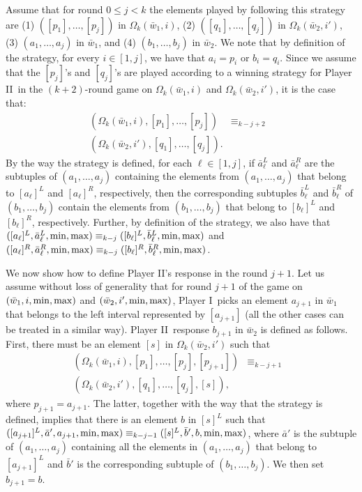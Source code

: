 \documentclass{LMCS}
\newcommand{\dupl}{Player II}
\newcommand{\spoiler}{Player I}
\newcommand{\w}{{\bar{w}}}
\renewcommand{\l}{\ell}
\theoremstyle{plain}
\theoremstyle{definition}
\begin{document}
Assume that for round $0 \leq j < k$ the elements played by following
this strategy are (1) $([p_1],\dots,[p_j])$ in $\Omega_k(\w_1,i)$, (2)
$([q_1],\dots,[q_j])$ in $\Omega_k(\w_2,i')$, (3) $(a_1,\dots,a_j)$ in
$\w_1$, and (4) $(b_1,\dots,b_j)$ in $\w_2$. We note that by
definition of the strategy, for every $i \in [1,j]$, we have that $a_i
= p_i$ or $b_i = q_i$. Since we assume that the $[p_j]$'s and
$[q_j]$'s are played according to a winning strategy for \dupl\ in the
$(k+2)$-round game on $\Omega_k(\w_1,i)$ and $\Omega_k(\w_2,i')$, it
is the case that: \begin{eqnarray*}
(\Omega_k(\w_1,i),[p_1],\dots,[p_j]) & \equiv_{k-j+2} &\\
(\Omega_k(\w_2,i'),[q_1],\dots,[q_j]).  \end{eqnarray*} By the way the
strategy is defined, for each $\l \in [1,j]$, if $\bar a_\l^L$ and
$\bar a_\l^R$ are the subtuples of $(a_1, \ldots, a_j)$ containing the
elements from $(a_1, \ldots, a_j)$ that belong to $[a_\l]^L$ and
$[a_\l]^R$, respectively, then the corresponding subtuples $\bar
b_\l^L$ and $\bar b_\l^R$ of $(b_1,\dots,b_j)$ contain the elements
from $(b_1, \ldots, b_j)$ that belong to $[b_\l]^L$ and $[b_\l]^R$,
respectively. Further, by definition of the strategy, we also have
that $([a_\l]^L,\bar a^L_\l,\min,\maxx) \equiv_{k - j} ([b_\l]^L,\bar
b^L_\l,\min,\maxx)$ and $([a_\l]^R,\bar a^R_\l,\min,\maxx) \equiv_{k -
j} ([b_\l]^R,\bar b^R_\l,\min,\maxx)$.



We now show how to define \dupl's response in the round $j+1$.  Let us
assume without loss of generality that for round $j+1$ of the game on
$(\w_1,i,\min,\maxx)$ and $(\w_2,i',\min,\maxx)$, \spoiler\ picks an
element $a_{j+1}$ in $\w_1$ that belongs to the left interval
represented by $[a_{j+1}]$ (all the other cases can be treated in a
similar way). \dupl\ response $b_{j+1}$ in $\w_2$ is defined as
follows. First, there must be an element $[s]$ in $\Omega_k(\w_2,i')$
such that \begin{eqnarray*}
(\Omega_k(\w_1,i),[p_1],\dots,[p_j],[p_{j+1}]) & \equiv_{k-j+1} & \\
(\Omega_k(\w_2,i'),[q_1],\dots,[q_j],[s]), \end{eqnarray*} where
$p_{j+1} = a_{j+1}$. The latter, together with the way that the
strategy is defined, implies that there is an element $b$ in $[s]^L$
such that $([a_{j+1}]^L,\bar a',a_{j+1},{\rm min},{\rm max}) \equiv_{k - j-1}
([s]^L,\bar b',b,{\rm min},{\rm max})$, where $\bar a'$ is the subtuple of
$(a_1, \ldots, a_j)$ containing all the elements in $(a_1,\dots,a_j)$
that belong to $[a_{j+1}]^L$ and $\bar b'$ is the corresponding
subtuple of $(b_1,\dots,b_j)$. We then set $b_{j+1} = b$.
\end{document}
